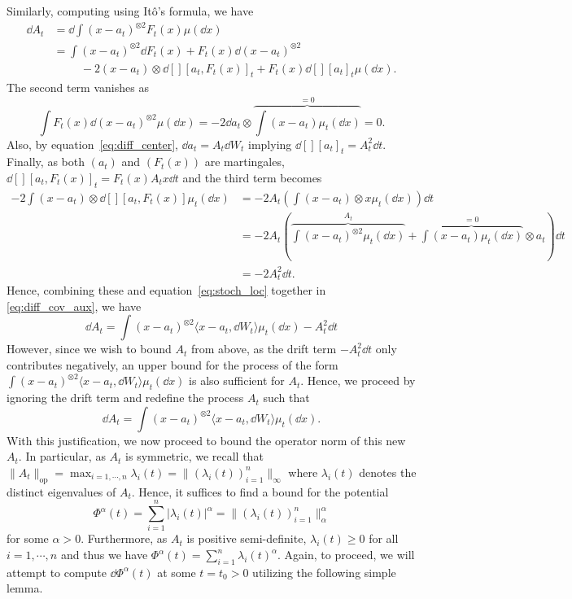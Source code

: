 Similarly, computing using Itô's formula, we have
\begin{equation}\label{eq:diff_cov_aux}
  \begin{split}
    \dd A_t & = \dd \int (x - a_t)^{\otimes 2} F_t(x) \mu(\dd x)\\
      & = \int (x - a_t)^{\otimes 2} \dd F_t(x) + F_t(x) \dd (x - a_t)^{\otimes 2}\\
      & \hspace{1cm} - 2 (x - a_t) \otimes \dd[][a_t, F_t(x)]_t +F_t(x)\dd[][a_t]_t\mu(\dd x).
  \end{split}
\end{equation}
The second term vanishes as 
\[\int F_t(x) \dd (x - a_t)^{\otimes 2} \mu(\dd x) = -2 \dd a_t \otimes 
  \overbrace{\int (x - a_t) \mu_t(\dd x)}^{= 0} = 0.\]
Also, by equation~\eqref{eq:diff_center}, \(\dd a_t = A_t \dd W_t\) implying \(\dd[][a_t]_t = A_t^2 \dd t\).
Finally, as both \((a_t)\) and \((F_t(x))\) are martingales, \(\dd[] [a_t, F_t(x)]_t = F_t(x) A_t x \dd t\) 
and the third term becomes
\begin{align*}
  -2 \int (x - a_t) \otimes \dd[] [a_t, F_t(x)] \mu_t(\dd x) 
  & = - 2A_t \left(\int (x - a_t) \otimes x \mu_t(\dd x)\right) \dd t \\
  & = -2 A_t \left(\overbrace{\int (x - a_t)^{\otimes 2} \mu_t(\dd x)}^{A_t} + 
    \overbrace{\int (x - a_t) \mu_t(\dd x)}^{= 0} \otimes a_t \right) \dd t\\ 
  & = -2 A_t^2 \dd t.
\end{align*}
Hence, combining these and equation~\eqref{eq:stoch_loc} together in \eqref{eq:diff_cov_aux}, we have
\[\dd A_t = \int (x - a_t)^{\otimes 2} \langle x - a_t, \dd W_t \rangle \mu_t(\dd x) - A_t^2 \dd t\]
However, since we wish to bound \(A_t\) from above, as the drift term \(- A_t^2 \dd t\) only contributes 
negatively, an upper bound for the process of the form 
\(\int (x - a_t)^{\otimes 2} \langle x - a_t, \dd W_t \rangle \mu_t(\dd x)\) is also sufficient for \(A_t\).
Hence, we proceed by ignoring the drift term and redefine the process \(A_t\) such that
\begin{equation}\label{eq:diff_cov}
  \dd A_t = \int (x - a_t)^{\otimes 2} \langle x - a_t, \dd W_t \rangle \mu_t(\dd x).
\end{equation}
With this justification, we now proceed to bound the operator norm of this new \(A_t\). In particular, 
as \(A_t\) is symmetric, we recall that \(\|A_t\|_{\text{op}} = \max_{i= 1, \cdots, n} \lambda_i(t) = \|(\lambda_i(t))_{i = 1}^n\|_\infty\) 
where \(\lambda_i(t)\) denotes the distinct eigenvalues of \(A_t\). Hence, it suffices to find a bound for the potential 
\begin{equation}
  \Phi^{\alpha}(t) = \sum_{i = 1}^n |\lambda_i(t)|^{\alpha} = \|(\lambda_i(t))_{i = 1}^n\|_\alpha^\alpha
\end{equation} 
for some \(\alpha > 0\). Furthermore, as \(A_t\) is positive 
semi-definite, \(\lambda_i(t) \ge 0\) for all \(i = 1, \cdots, n\) and thus we have
\(\Phi^\alpha(t) = \sum_{i = 1}^n \lambda_i(t)^{\alpha}\). Again, to proceed, we will attempt to compute 
\(\dd \Phi^\alpha(t)\) at some \(t = t_0 > 0\) utilizing the following simple lemma.

